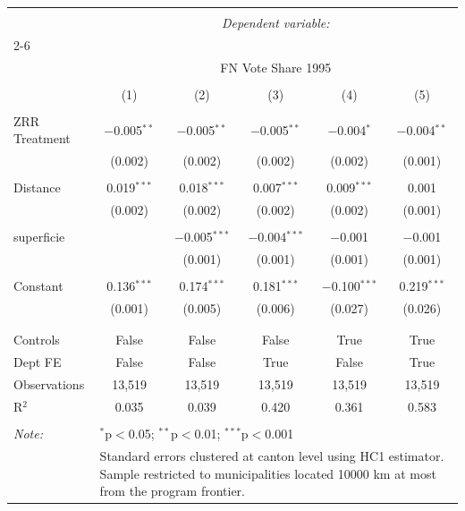 
\begin{tabular}{@{\extracolsep{3pt}}lccccc}
\\[-1.8ex]\hline
\hline \\[-1.8ex]
 & \multicolumn{5}{c}{\textit{Dependent variable:}} \\
\cline{2-6}
\\[-1.8ex] & \multicolumn{5}{c}{FN Vote Share 1995} \\
\\[-1.8ex] & (1) & (2) & (3) & (4) & (5)\\
\hline \\[-1.8ex]
 ZRR Treatment & $-$0.005$^{**}$ & $-$0.005$^{**}$ & $-$0.005$^{**}$ & $-$0.004$^{*}$ & $-$0.004$^{**}$ \\
  & (0.002) & (0.002) & (0.002) & (0.002) & (0.001) \\
  & & & & & \\
 Distance & 0.019$^{***}$ & 0.018$^{***}$ & 0.007$^{***}$ & 0.009$^{***}$ & 0.001 \\
  & (0.002) & (0.002) & (0.002) & (0.002) & (0.001) \\
  & & & & & \\
 superficie &  & $-$0.005$^{***}$ & $-$0.004$^{***}$ & $-$0.001 & $-$0.001 \\
  &  & (0.001) & (0.001) & (0.001) & (0.001) \\
  & & & & & \\
 Constant & 0.136$^{***}$ & 0.174$^{***}$ & 0.181$^{***}$ & $-$0.100$^{***}$ & 0.219$^{***}$ \\
  & (0.001) & (0.005) & (0.006) & (0.027) & (0.026) \\
  & & & & & \\
\hline \\[-1.8ex]
Controls & False & False & False & True & True \\
Dept FE & False & False & True & False & True \\
Observations & 13,519 & 13,519 & 13,519 & 13,519 & 13,519 \\
R$^{2}$ & 0.035 & 0.039 & 0.420 & 0.361 & 0.583 \\
\hline
\hline \\[-1.8ex]
\textit{Note:}  & \multicolumn{5}{l}{$^{*}$p$<$0.05; $^{**}$p$<$0.01; $^{***}$p$<$0.001} \\
 & \multicolumn{5}{l}{Standard errors clustered at canton level using HC1 estimator. Sample restricted to municipalities located 10000 km at most from the program frontier.} \\
\end{tabular}
